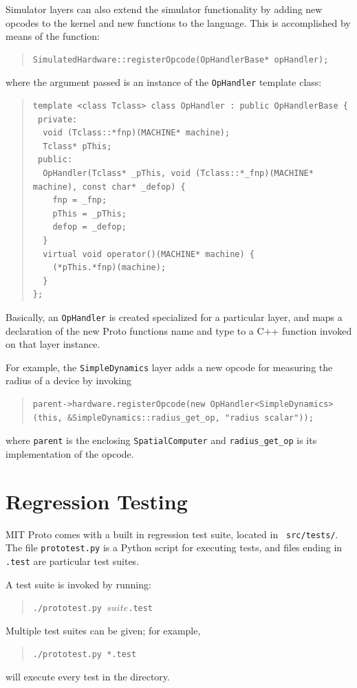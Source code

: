 \documentclass{article}
\newcommand\code[1]{\begin{quote}\var{#1}\end{quote}}
\newcommand\var[1]{{\tt #1}}
\begin{document}
Simulator layers can also extend the simulator functionality by
adding new opcodes to the kernel and new functions to the language.
This is accomplished by means of the function:
\begin{quote}
\begin{verbatim}
SimulatedHardware::registerOpcode(OpHandlerBase* opHandler);
\end{verbatim}
\end{quote}
where the argument passed is an instance of the \var{OpHandler} template
class:
\begin{quote}
\begin{verbatim}
template <class Tclass> class OpHandler : public OpHandlerBase {
 private:
  void (Tclass::*fnp)(MACHINE* machine);
  Tclass* pThis;
 public:
  OpHandler(Tclass* _pThis, void (Tclass::*_fnp)(MACHINE* machine), const char* _defop) {
    fnp = _fnp;
    pThis = _pThis;
    defop = _defop;
  }
  virtual void operator()(MACHINE* machine) {
    (*pThis.*fnp)(machine);
  }
};
\end{verbatim}
\end{quote}

Basically, an \var{OpHandler} is created specialized for a particular
layer, and maps a declaration of the new Proto functions name and type
to a C++ function invoked on that layer instance.

For example, the \var{SimpleDynamics} layer adds a new opcode for measuring
the radius of a device by invoking
\begin{quote}
\begin{verbatim}
parent->hardware.registerOpcode(new OpHandler<SimpleDynamics>(this, &SimpleDynamics::radius_get_op, "radius scalar"));
\end{verbatim}
\end{quote}
where \var{parent} is the enclosing \var{SpatialComputer} and
\var{radius\_get\_op} is its implementation of the opcode.


\section{Regression Testing}

MIT Proto comes with a built in regression test suite, located in {\tt
  src/tests/}.  The file {\tt prototest.py} is a Python script for
executing tests, and files ending in {\tt .test} are particular test suites.

A test suite is invoked by running: \code{./prototest.py $suite$.test}
Multiple test suites can be given; for example, \code{./prototest.py
  *.test} will execute every test in the directory.
\end{document}
